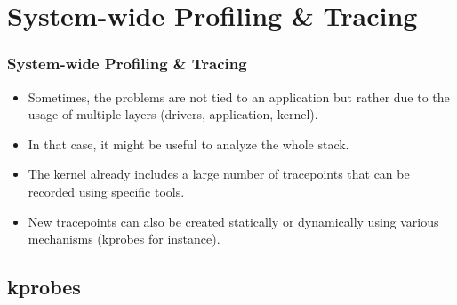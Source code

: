 \section{System-wide Profiling \& Tracing}

\begin{frame}
  \frametitle{System-wide Profiling \& Tracing}
  \begin{itemize}
    \item Sometimes, the problems are not tied to an application but rather
          due to the usage of multiple layers (drivers, application, kernel).
    \item In that case, it might be useful to analyze the whole stack.
    \item The kernel already includes a large number of tracepoints that can be
          recorded using specific tools.
    \item New tracepoints can also be created statically or dynamically using
          various mechanisms (kprobes for instance).
  \end{itemize}
\end{frame}

\subsection{kprobes}

